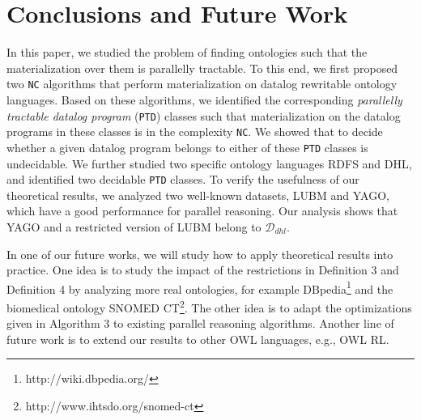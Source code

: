 \documentclass{article}
\begin{document}
\section{Conclusions and Future Work}

In this paper, we studied the problem of finding ontologies such that the materialization over them is parallelly tractable. To this end,
we first proposed two \texttt{NC} algorithms that perform materialization on datalog rewritable ontology languages.
Based on these algorithms, we identified the corresponding \emph{parallelly tractable datalog program} (\texttt{PTD}) classes such that materialization on the datalog programs in these classes is in the complexity \texttt{NC}.
We showed that to decide whether a given datalog program belongs to either of these \texttt{PTD} classes is undecidable. We further studied two specific ontology languages RDFS and DHL, and identified two decidable \texttt{PTD} classes. To verify the usefulness of our theoretical results, we analyzed two well-known datasets, LUBM and YAGO,
which have a good performance for parallel reasoning. Our analysis shows that YAGO and a
restricted version of LUBM belong to $\mathcal{D}_{dhl}$.

In one of our future works, we will study how to apply theoretical results into practice.
One idea is to study the impact of the restrictions in Definition 3 and Definition 4 by analyzing more real ontologies,
for example DBpedia\footnote{http://wiki.dbpedia.org/} and the biomedical ontology SNOMED CT\footnote{http://www.ihtsdo.org/snomed-ct}.
The other idea is to adapt the optimizations given in Algorithm 3 to existing parallel reasoning algorithms.
Another line of future work is to extend our results to other OWL languages, e.g., OWL RL.



\end{document}
